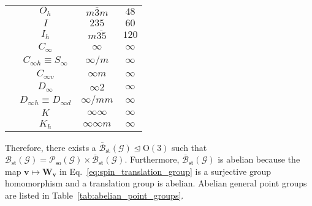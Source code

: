 \begin{table}[tb]
\begin{tabular}{cccc}
    & $O_{h}$ & $m\overline{3}m$ & $48$ \\
    & $I$     & $235$            & $60$ \\
    & $I_{h}$ & $m\overline{35}$ & $120$ \\
    \hline
    & $C_{\infty}$                       & $\infty$          & $\infty$ \\
    & $C_{\infty h} \equiv S_{\infty}$   & $\infty / m$      & $\infty$ \\
    & $C_{\infty v}$                     & $\infty m$        & $\infty$ \\
    & $D_{\infty}$                       & $\infty 2$        & $\infty$ \\
    & $D_{\infty h} \equiv D_{\infty d}$ & $\infty / mm$     & $\infty$\\
    & $K$                                & $\infty \infty$   & $\infty$\\
    & $K_{h}$                            & $\infty \infty m$ & $\infty$\\
    \hline \hline
  \end{tabular}
\end{table}

Therefore, there exists a  $\bar{\mathcal{B}}_{\mathrm{st}}(\mathcal{G}) \trianglelefteq \mathrm{O}(3)$ such that $\mathcal{B}_{\mathrm{st}}(\mathcal{G}) = \mathcal{P}_{\mathrm{so}}(\mathcal{G}) \times \bar{\mathcal{B}}_{\mathrm{st}}(\mathcal{G})$.
Furthermore, $\bar{\mathcal{B}}_{\mathrm{st}}(\mathcal{G})$ is abelian because the map $\bm{v} \mapsto \bm{W}_{\bm{v}}$ in Eq.~\eqref{eq:spin_translation_group} is a surjective group homomorphism and a translation group is abelian.
Abelian general point groups are listed in Table~\ref{tab:abelian_point_groups}.

